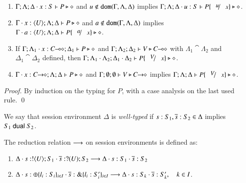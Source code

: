\begin{lemma}\rm
	\label{lem:subst}
	\begin{enumerate}[1.]
		\item	$\Gamma; \Lambda; \Delta \cdot x:S  \vdash P \triangleright \diamond$ and
			$u \not\in \mathtt{dom}(\Gamma, \Lambda, \Delta)$
			implies
			$\Gamma; \Lambda; \Delta \cat u:S  \proves P\subst{u}{x} \hastype \Proc$.

		\item	$\Gamma \cdot x:\langle U \rangle; \Lambda; \Delta \vdash P \triangleright \diamond$ and
			$a \notin \mathtt{dom}(\Gamma, \Lambda, \Delta)$
			implies
			$\Gamma \cat a:\chtype{U}; \Lambda; \Delta \proves P\subst{a}{x} \hastype \Proc$.

		\item	If $\Gamma; \Lambda_1 \cdot x:C\!\! \multimap\!\! \diamond; \Delta_1  \vdash P \triangleright \diamond$ 
			and $\Gamma; \Lambda_2; \Delta_2  \vdash V \triangleright C\!\! \multimap\!\! \diamond$ with 
			$\Lambda_1 \cat \Lambda_2$ and $\Delta_1 \cat \Delta_2$ defined,
			then $\Gamma; \Lambda_1 \cat \Lambda_2; \Delta_1 \cat \Delta_2  \proves P\subst{V}{x} \hastype \Proc$.

		\item	$\Gamma \cdot x:C\!\! \rightarrow\!\! \diamond; \Lambda; \Delta  \vdash P \triangleright \diamond$ and
			$\Gamma; \emptyset ; \emptyset \vdash V \triangleright C\!\! \rightarrow\!\! \diamond$
			implies
			$\Gamma; \Lambda; \Delta \proves P\subst{V}{x} \hastype \Proc$.
		\end{enumerate}
\end{lemma}

\begin{proof}
	By induction on the typing for $P$, with a case analysis on the last used rule. 
	\qed
\end{proof}

\begin{definition}\label{d:wtenv}\rm
	We say that session environment $\Delta$ is {\em well-typed} if
	$s: S_1, \overline{s}: S_2 \in \Delta$ implies $S_1 \ \mathsf{dual}\  S_2$.
\end{definition}

\begin{definition}\rm
\label{def:ses_red}
	The reduction relation $\longrightarrow$ on session environments is defined as:
%
	\begin{enumerate}[$-$]
		\item	$\Delta \cdot s: ! \langle U \rangle ; S_1 \cdot \overline{s}: ? (U) ; S_2 \longrightarrow \Delta \cdot s: S_1 \cdot \overline{s}: S_2$
		\item	$\Delta \cdot s: \oplus \{l_i: S_i\}_{i \in I} \cdot \overline{s}: \& \{l_i: S_i'\}_{i \in I} \longrightarrow \Delta \cdot s: S_k \cdot \overline{s}: S_k', \quad k \in I$.
	\end{enumerate}
\end{definition}

